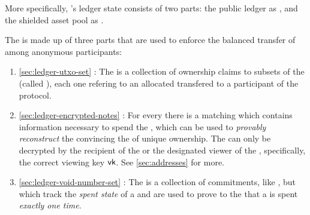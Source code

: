 More specifically, \MantaPay{}'s ledger state \Ledger{} consists of two parts: the public ledger as \PublicLedger{}, and the shielded asset pool as \ShieldedAssetPool{}.

\begin{center}
    \vspace{1em}
    \begin{mdframed}[leftmargin=0.2\textwidth, rightmargin=0.2\textwidth]
        \begin{center}
        \end{center}
    \end{mdframed}
    \vspace{-1em}
\end{center}

The \ShieldedAssetPool{} is made up of three parts that are used to enforce the balanced transfer of  among anonymous participants:

\begin{enumerate}
    \item \autoref{sec:ledger-utxo-set} \UTXOSet{}: The \UTXOSet{} is a collection of ownership claims to subsets of the \ShieldedAssetPool{} (called ), each one refering to an allocated \PrivateAsset{} transfered to a participant of the protocol.
    \item \autoref{sec:ledger-encrypted-notes} : For every \UTXO{} there is a matching \EncryptedNote{} which contains information necessary to spend the \PrivateAsset{}, which can be used to \emph{provably reconstruct} the \UTXO{} convincing the \Ledger{} of unique ownership. The \EncryptedNote{} can only be decrypted by the recipient of the \PrivateAsset{} or the designated viewer of the \UTXO{}, specifically, the correct viewing key ${\textsf{vk}}$. See \autoref{sec:addresses} for more.
    \item \autoref{sec:ledger-void-number-set} \VoidNumberSet{}: The \VoidNumberSet{} is a collection of commitments, like , but which track the \emph{spent state} of a \PrivateAsset{} and are used to prove to the \Ledger{} that a \PrivateAsset{} is spent \emph{exactly one time}. 
\end{enumerate}

